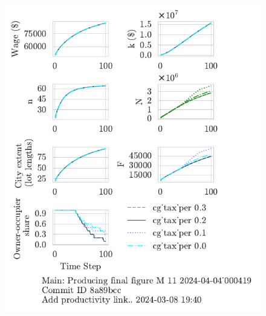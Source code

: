 \begin{figure}[h!tb] 
    \centering
    \includegraphics[scale=.75, trim={0 1.4cm .5cm 0},clip]{fig/cg_tax_per-000419.pdf} 

\end{figure}
